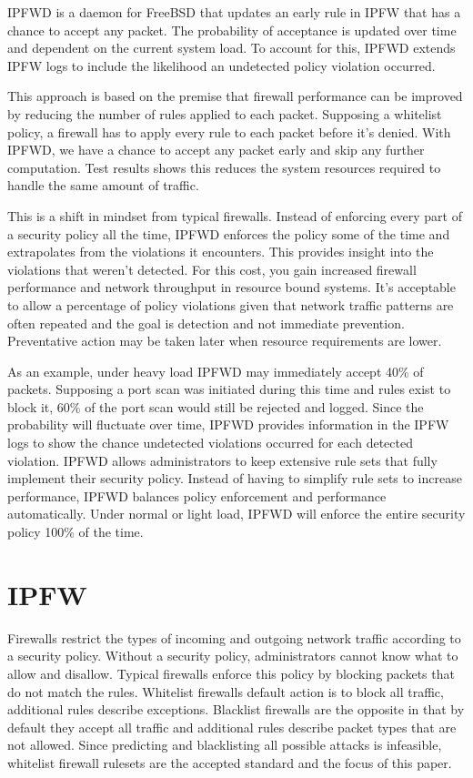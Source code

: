 \documentclass[journal]{IEEEtran}
\begin{document}
IPFWD is a daemon for FreeBSD that updates an early rule in IPFW that has a
chance to accept any packet. The probability of acceptance is updated over time
and dependent on the current system load. To account for this, IPFWD extends
IPFW logs to include the likelihood an undetected policy violation occurred.

This approach is based on the premise that firewall performance can be improved
by reducing the number of rules applied to each packet. Supposing a whitelist
policy, a firewall has to apply every rule to each packet before it's denied.
With IPFWD, we have a chance to accept any packet early and skip any further
computation. Test results shows this reduces the system resources required to
handle the same amount of traffic.

This is a shift in mindset from typical firewalls. Instead of enforcing every
part of a security policy all the time, IPFWD enforces the policy some of the
time and extrapolates from the violations it encounters. This provides insight
into the violations that weren't detected. For this cost, you gain increased
firewall performance and network throughput in resource bound systems. It's
acceptable to allow a percentage of policy violations given that network
traffic patterns are often repeated and the goal is detection and not immediate
prevention. Preventative action may be taken later when resource requirements
are lower.

As an example, under heavy load IPFWD may immediately accept 40\% of packets.
Supposing a port scan was initiated during this time and rules exist to block
it, 60\% of the port scan would still be rejected and logged. Since the
probability will fluctuate over time, IPFWD provides information in the IPFW
logs to show the chance undetected violations occurred for each detected
violation. IPFWD allows administrators to keep extensive rule sets that fully
implement their security policy. Instead of having to simplify rule sets to
increase performance, IPFWD balances policy enforcement and performance
automatically. Under normal or light load, IPFWD will enforce the entire
security policy 100\% of the time.

\section{IPFW}

Firewalls restrict the types of incoming and outgoing network traffic according
to a security policy. Without a security policy, administrators cannot know
what to allow and disallow. Typical firewalls enforce this policy by blocking
packets that do not match the rules. Whitelist firewalls default action is to
block all traffic, additional rules describe exceptions. Blacklist firewalls
are the opposite in that by default they accept all traffic and additional
rules describe packet types that are not allowed. Since predicting and
blacklisting all possible attacks is infeasible, whitelist firewall rulesets
are the accepted standard and the focus of this paper.
\end{document}
